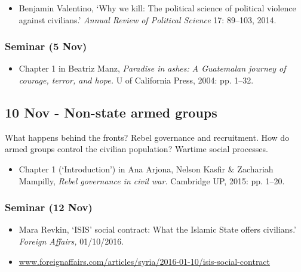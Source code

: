 \documentclass[12pt, a4paper]{article}
\begin{document}
\begin{itemize}
\setlength\itemsep{0pt}
\item Benjamin Valentino, `Why we kill: The political science of political violence against civilians.' \textit{Annual Review of Political Science} 17: 89--103, 2014.
\end{itemize}

\subsubsection*{Seminar (5 Nov)}

\begin{itemize}
\setlength\itemsep{0pt}
\item Chapter 1 in Beatriz Manz, \textit{Paradise in ashes: A Guatemalan journey of courage, terror, and hope.} U of California Press, 2004: pp. 1--32.
\end{itemize}

\subsection*{10 Nov - Non-state armed groups}

What happens behind the fronts? Rebel governance and recruitment. How do armed groups control the civilian population? Wartime social processes.

\begin{itemize}
\setlength\itemsep{0pt}
\item Chapter 1 (`Introduction') in Ana Arjona, Nelson Kasfir \& Zachariah Mampilly, \textit{Rebel governance in civil war.} Cambridge UP, 2015: pp. 1--20.
\end{itemize}

\subsubsection*{Seminar (12 Nov)}

\begin{itemize}
\setlength\itemsep{-5pt}
\item Mara Revkin, `ISIS' social contract: What the Islamic State off ers civilians.' \textit{Foreign Affairs,} 01/10/2016.
\item[] \href{https://www.foreignaffairs.com/articles/syria/2016-01-10/isis-social-contract}{www.foreignaffairs.com/articles/syria/2016-01-10/isis-social-contract}
\end{itemize}
\end{document}
